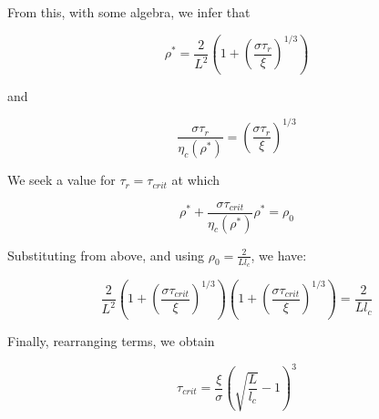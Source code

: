 From this, with some algebra, we infer that

\begin{equation}
	\label{drho_4}
	\rho^* = \frac{2}{L^2}\left ( 1 + \left( \frac{\sigma\tau_r}{\xi}\right )^{1/3} \right )
\end{equation}

and 

\begin{equation}
	\label{drho_5}
	\frac{\sigma\tau_r}{\eta_c(\rho^*)} =  \left( \frac{\sigma\tau_r}{\xi}\right )^{1/3} 
\end{equation}

We seek a value for $\tau_r=\tau_{crit}$ at which


\begin{equation}
	\label{drho_6}
	\rho^* + \frac{\sigma\tau_{crit}}{\eta_c(\rho^*)}\rho^* =  \rho_0
\end{equation}

Substituting from above, and using $\rho_0=\frac{2}{L l_c}$, we have:

\begin{equation}
	\label{drho_7}
	\frac{2}{L^2}\left ( 1 + \left( \frac{\sigma\tau_{crit}}{\xi}\right )^{1/3}  \right )
	\left ( 1 + \left( \frac{\sigma\tau_{crit}}{\xi}\right )^{1/3}  \right )
	= \frac{2}{L l_c}
\end{equation}

Finally, rearranging terms, we obtain

\begin{equation}
	\label{drho_8}
	\tau_{crit}=\frac{\xi}{\sigma}\left( \sqrt{\frac{L}{l_c}}-1\right )^3
\end{equation}




